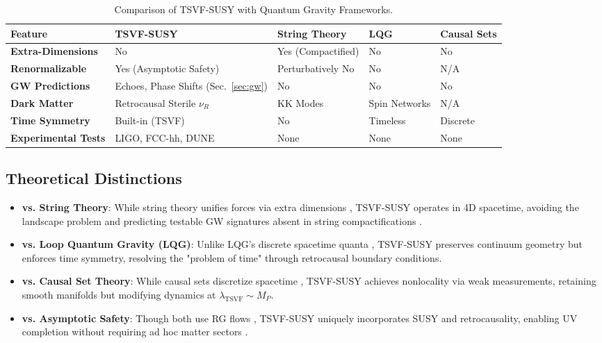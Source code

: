 \documentclass[twocolumn,superscriptaddress,floatfix]{revtex4-2}
\begin{document}
\begin{table}[ht]
\centering
\caption{Comparison of TSVF-SUSY with Quantum Gravity Frameworks.}
\label{tab:qg_comparison}
\begin{tabular}{p{2.0cm} p{2.0cm} p{2.0cm} p{2.0cm} p{2.0cm}}
\toprule
\textbf{Feature} & \textbf{TSVF-SUSY} & \textbf{String Theory} & \textbf{LQG} & \textbf{Causal Sets} \\
\midrule
\textbf{Extra-Dimensions} & No & Yes (Compactified) & No & No \\
\textbf{Renormalizable} & Yes (Asymptotic Safety) & Perturbatively No & No & N/A \\
\textbf{GW Predictions} & Echoes, Phase Shifts (Sec.~\ref{sec:gw}) & No & No & No \\
\textbf{Dark Matter} & Retrocausal Sterile \(\nu_R\) & KK Modes & Spin Networks & N/A \\
\textbf{Time Symmetry} & Built-in (TSVF) & No & Timeless & Discrete \\
\textbf{Experimental Tests} & LIGO, FCC-hh, DUNE & None & None & None \\
\bottomrule
\end{tabular}
\end{table}

\subsection{Theoretical Distinctions}
\label{subsec:theory_distinctions}

\begin{itemize}
\item \textbf{vs. String Theory}: While string theory unifies forces via extra dimensions \cite{Polchinski1998}, TSVF-SUSY operates in 4D spacetime, avoiding the landscape problem \cite{Susskind2003} and predicting testable GW signatures absent in string compactifications \cite{Green2012}.  
\item \textbf{vs. Loop Quantum Gravity (LQG)}: Unlike LQG's discrete spacetime quanta \cite{Rovelli2004}, TSVF-SUSY preserves continuum geometry but enforces time symmetry, resolving the "problem of time" \cite{Kuchar2011} through retrocausal boundary conditions.  
\item \textbf{vs. Causal Set Theory}: While causal sets discretize spacetime \cite{Sorkin2003}, TSVF-SUSY achieves nonlocality via weak measurements, retaining smooth manifolds but modifying dynamics at \( \lambda_{\text{TSVF}} \sim M_P \).  
\item \textbf{vs. Asymptotic Safety}: Though both use RG flows \cite{Reuter1998}, TSVF-SUSY uniquely incorporates SUSY and retrocausality, enabling UV completion without requiring ad hoc matter sectors \cite{Niedermaier2006}.  
\end{itemize}
\end{document}

